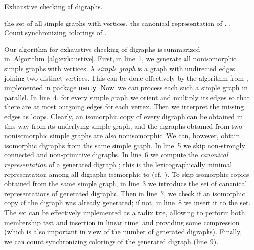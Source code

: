 \documentclass[runningheads]{llncs}
\begin{document}
\begin{algorithm}
\caption{Exhaustive checking of digraphs.}
\label{alg:exhaustive}
\begin{algorithmic}[1]
\State  the set of all simple graphs with  vertices.
  \State  {}
      \State  the canonical representation of .
      \If{}
        \State .
        \State Count synchronizing colorings of .
      \EndIf
    \EndIf
  \EndFor
\EndFor
\end{algorithmic}
\end{algorithm}

Our algorithm for exhaustive checking of digraphs is summarized in~Algorithm~\ref{alg:exhaustive}.
First, in line~1, we generate all nonisomorphic simple graphs with  vertices. A \emph{simple graph} is a graph with undirected edges joining two distinct vertices. This can be done effectively by the algorithm from \cite{McKayPiperno2014PracticalGraphIsomorphismII}, implemented in package \texttt{nauty}.
Now, we can process each such a simple graph in parallel. In line~4, for every simple graph  we orient and multiply its edges so that there are at most  outgoing edges for each vertex. Then we interpret the missing edges as loops.
Clearly, an isomorphic copy of every digraph can be obtained in this way from its underlying simple graph, and the digraphs obtained from two nonisomorphic simple graphs are also nonisomorphic. We can, however, obtain isomorphic digraphs from the same simple graph.
In line~5 we skip non-strongly connected and non-primitive digraphs.
In line~6 we compute the \emph{canonical representation} of a generated digraph ; this is the lexicographically minimal representation among all digraphs isomorphic to  (cf.~\cite{McKayPiperno2014PracticalGraphIsomorphismII}).
To skip isomorphic copies obtained from the same simple graph, in line~3 we introduce the set  of canonical representations of generated digraphs. Then in line~7, we check if an isomorphic copy of the digraph  was already generated; if not, in line~8 we insert it to the set. The set  can be effectively implemented as a radix trie, allowing to perform both membership test and insertion in linear time, and providing some compression (which is also important in view of the number of generated digraphs).
Finally, we can count synchronizing colorings of the generated digraph (line~9).
\end{document}
